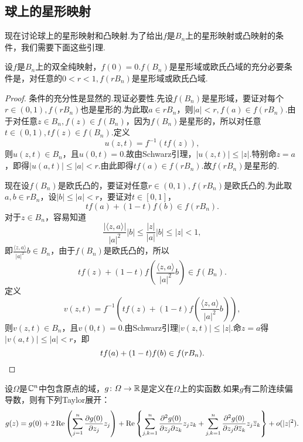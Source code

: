 \subsection{球上的星形映射}
现在讨论球上的星形映射和凸映射.为了给出$f$是$B_n$上的星形映射或凸映射的条件，我们需要下面这些引理.
\begin{lemma}\label{lem2.5.8}
	设$f$是$B_n$上的双全纯映射，$f(0)=0.f(B_n)$是星形域或欧氏凸域的充分必要条件是，对任意的$0<r<1,f(rB_n)$是星形域或欧氏凸域.
\end{lemma}
\begin{proof}
	条件的充分性是显然的.现证必要性.先设$f(B_n)$是星形域，要证对每个$r\in(0,1),f(rB_n)$也是星形的.为此取$a\in rB_n$，则$|a|<r,f(a)\in f(rB_n)$.由于对任意$z\in B_n,f(z)\in f(B_n)$，因为$f(B_n)$是星形的，所以对任意$t\in(0,1),tf(z)\in f(B_n)$.定义
	\[u(z,t)=f^{-1}(tf(z)),\]
	则$u(z,t)\in B_n$，且$u(0,t)=0$.故由Schwarz引理，$|u(z,t)|\le|z|$.特别命$z=a$，即得$|u(a,t)|\le|a|<r$.由此即得$tf(a)\in f(rB_n)$.故$f(rB_n)$是星形的.
	
	现在设$f(B_n)$是欧氏凸的，要证对任意$r\in(0,1),f(rB_n)$是欧氏凸的.为此取$a,b\in rB_n$，设$|b|\le|a|<r$，要证对$t\in[0,1]$，
	\[tf(a)+(1-t)f(b)\in f(rB_n).\]
	对于$z\in B_n$，容易知道
	\[\frac{|\langle z,a\rangle|}{|a|^2}|b|\le\frac{|z|}{|a|}|b|\le|z|<1,\]
	即$\frac{\langle z,a\rangle}{|a|^2}b\in B_n$，由于$f(B_n)$是欧氏凸的，所以
	\[tf(z)+(1-t)f\left(\frac{\langle z,a\rangle}{|a|^2}b\right)\in f(B_n).\]
	定义
	\[v(z,t)=f^{-1}\left(tf(z)+(1-t)f\left(\frac{\langle z,a\rangle}{|a|^2}b\right)\right),\]
	则$v(z,t)\in B_n$，且$v(0,t)=0$.由Schwarz引理$|v(z,t)|\le|z|$.命$z=a$得$|v(a,t)|\le|a|<r$，即
	\[tf(a)+(1-t)f(b)\in f(rB_n).\qedhere\]
\end{proof}
\begin{lemma}\label{lem2.5.9}
	设$\Omega$是$\mathbb C^n$中包含原点的域，$g\colon\varOmega\to\mathbb R$是定义在$\Omega$上的实函数.如果$g$有二阶连续偏导数，则有下列Taylor展开：
	\begin{equation}\label{eq2.5.13}
		g(z)=g(0)+2\operatorname{Re}\left(\sum_{j=1}^{n}\frac{\partial g(0)}{\partial z_j}z_j\right)+\operatorname{Re}\left\{\sum_{j,k=1}^{n}\frac{\partial^2 g(0)}{\partial z_j\partial z_k} z_j z_k+\sum_{j,k=1}^{n}\frac{\partial^2 g(0)}{\partial z_j\partial {}\mkern1mu\overline{\mkern-1muz}_k} z_j {}\mkern1mu\overline{\mkern-1muz}_k\right\}+o(|z|^2).
	\end{equation}
\end{lemma}
